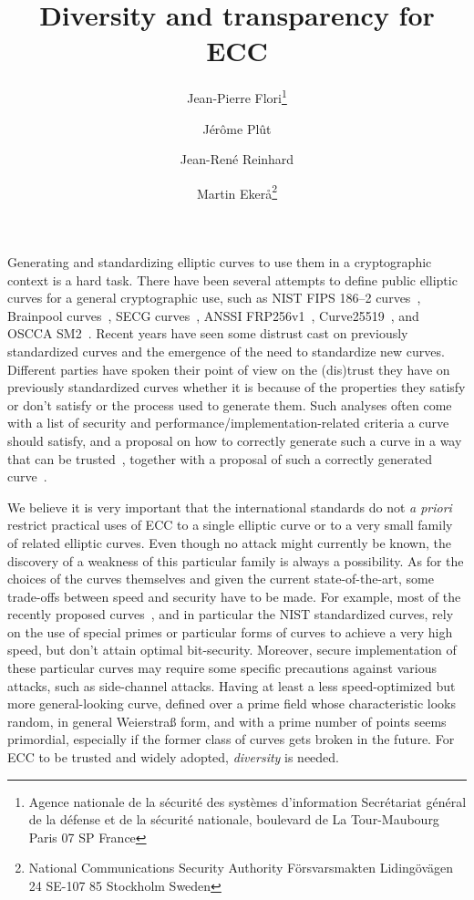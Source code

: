 \documentclass[twocolumn,letterpaper,10pt]{article}
\title{Diversity and transparency for ECC}
\author{Jean-Pierre Flori\thanks{Agence nationale de la sécurité des systèmes d'information\newline%
Secrétariat général de la défense et de la sécurité nationale\newline%
51, boulevard de La Tour-Maubourg\newline%
75700 Paris 07 SP\newline%
France}%
\and Jérôme Plût\footnotemark[1]%
\and Jean-René Reinhard\footnotemark[1]%
\and Martin Ekerå\thanks{National Communications Security Authority\newline%
Försvarsmakten\newline%
Lidingövägen 24\newline%
SE-107 85 Stockholm\newline%
Sweden}}
\date{}
\def\gitkw$#1:#2${{\small \textbf{#1:} \texttt{#2}}}
\begin{document}
\sloppy
\maketitle
Generating and standardizing elliptic curves to use them in a cryptographic
context is a hard task.
There have been several attempts to define public elliptic curves
for a general cryptographic use,
such as NIST FIPS 186--2 curves~\cite{nist2000fips186-2},
Brainpool curves~\cite{rfc5639},
SECG curves~\cite{certicom2010sec2},
ANSSI FRP256v1~\cite{jorf2011ce},
Curve25519~\cite{pkc2006bernstein},
and OSCCA SM2~\cite{oscca2010sm2}.
Recent years have seen some distrust cast on previously standardized
curves
and the emergence of the need to standardize new curves.
Different parties have spoken their point of view on the (dis)trust they have
on previously standardized curves whether it is because of
the properties they satisfy or don't satisfy
or the process used to generate them.
Such analyses often come with
a list of security and performance/implementation-related criteria
a curve should satisfy,
and a proposal on how to correctly generate such a curve in a way that can be
trusted~\cite{safecurves,msr2014bcln,brainpool2005,eprint2014brainpool,eprint2013abgr},
together with a proposal of such a correctly generated
curve~\cite{pkc2006bernstein,msr2014bcln,eprint2013abgr}.

\medskip
We believe it is very important that the international standards
do not \emph{a priori} restrict practical uses of ECC
to a single elliptic curve
or to a very small family of related elliptic curves.
Even though no attack might currently be known,
the discovery of a weakness of this particular family
is always a possibility.
As for the choices of the curves themselves
and given the current state-of-the-art,
some trade-offs between speed and security have to be made.
For example, most of the recently proposed
curves~\cite{pkc2006bernstein,msr2014bcln,eprint2013abgr,oscca2010sm2},
and in particular the NIST standardized curves,
rely on the use of special primes or particular forms of curves to
achieve a very high speed,
but don't attain optimal bit-security.
Moreover, secure implementation of these particular curves
may require some specific precautions against various attacks,
such as side-channel attacks.
Having at least a less speed-optimized but more general-looking curve,
defined over a prime field whose characteristic looks random,
in general Weierstraß form, and with a prime number of points
seems primordial,
especially if the former class of curves gets broken in the future.
For ECC to be trusted and widely adopted, \emph{diversity} is needed.
\end{document}
